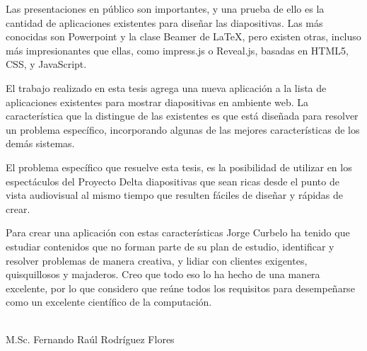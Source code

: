 
\begin{opinion}

    Las presentaciones en público son importantes, y una prueba de ello es la cantidad de aplicaciones existentes para diseñar las diapositivas.  Las más conocidas son Powerpoint y la clase Beamer de \LaTeX{}, pero existen otras, incluso más impresionantes que ellas, como impress.js o Reveal.js, basadas en HTML5, CSS, y JavaScript.   

    El trabajo realizado en esta tesis agrega una nueva aplicación a la lista de aplicaciones existentes para mostrar diapositivas en ambiente web.  La característica que la distingue de las existentes es que está diseñada para resolver un problema específico, incorporando algunas de las mejores características de los demás sistemas.

    El problema específico que resuelve esta tesis, es la posibilidad de utilizar en los espectáculos del Proyecto Delta diapositivas que sean ricas desde el punto de vista audiovisual al mismo tiempo que resulten fáciles de diseñar y rápidas de crear.

    Para crear una aplicación con estas características Jorge Curbelo ha tenido que estudiar contenidos que no forman parte de su plan de estudio, identificar y resolver problemas de manera creativa, y lidiar con clientes exigentes, quisquillosos y majaderos.  Creo que todo eso lo ha hecho de una manera excelente, por lo que considero que reúne todos los requisitos para desempeñarse como un excelente científico de la computación.


\vfill
\begin{flushright}
\underline{\hspace{186pt}}\hfill \\
M.Sc. Fernando Ra\'ul Rodríguez Flores
\end{flushright}
\end{opinion}
